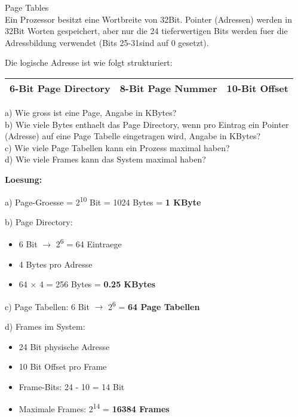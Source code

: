 \begin{example2}{Page Tables}\\
    Ein Prozessor besitzt eine Wortbreite von 32Bit. Pointer (Adressen) werden in 32Bit Worten gespeichert, aber nur die 24 tieferwertigen Bits werden fuer die Adressbildung verwendet (Bits 25-31sind auf 0 gesetzt).
    
    Die logische Adresse ist wie folgt strukturiert:
    \begin{center}
    \begin{tabular}{|c|c|c|}
    \hline
    6-Bit Page Directory & 8-Bit Page Nummer & 10-Bit Offset \\
    \hline
    \end{tabular}
    \end{center}
    
    a) Wie gross ist eine Page, Angabe in KBytes?\\
    b) Wie viele Bytes enthaelt das Page Directory, wenn pro Eintrag ein Pointer (Adresse) auf eine Page Tabelle eingetragen wird, Angabe in KBytes?\\
    c) Wie viele Page Tabellen kann ein Prozess maximal haben?\\
    d) Wie viele Frames kann das System maximal haben?
    
    \tcblower
    
    \textbf{Loesung:}
    
    a) Page-Groesse = 2\textsuperscript{10} Bit = 1024 Bytes = \textbf{1 KByte}
    
    b) Page Directory:
    \begin{itemize}
        \item 6 Bit $\rightarrow$ 2\textsuperscript{6} = 64 Eintraege
        \item 4 Bytes pro Adresse
        \item 64 × 4 = 256 Bytes = \textbf{0.25 KBytes}
    \end{itemize}
    
    c) Page Tabellen: 6 Bit $\rightarrow$ 2\textsuperscript{6} = \textbf{64 Page Tabellen}
    
    d) Frames im System:
    \begin{itemize}
        \item 24 Bit physische Adresse
        \item 10 Bit Offset pro Frame
        \item Frame-Bits: 24 - 10 = 14 Bit
        \item Maximale Frames: 2\textsuperscript{14} = \textbf{16384 Frames}
    \end{itemize}
\end{example2}

